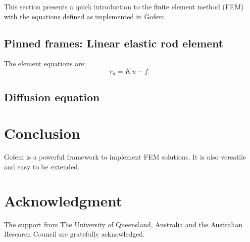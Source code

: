 \documentclass[twoside,journal]{IEEEtran}
\begin{document}
This section presents a quick introduction to the finite element method (FEM) with the equations defined as implemented in Gofem.




\subsection{Pinned frames: Linear elastic rod element}

The element equations are:
\begin{equation}
r_u = K \, u - f
\end{equation}




\subsection{Diffusion equation}



\section{Conclusion}
\label{sec:conclusion}

Gofem is a powerful framework to implement FEM solutions. It is also versatile and easy to be
extended.



\section*{Acknowledgment}

The support from The University of Queensland, Australia and the Australian Research Council are
gratefully acknowledged.





\end{document}
